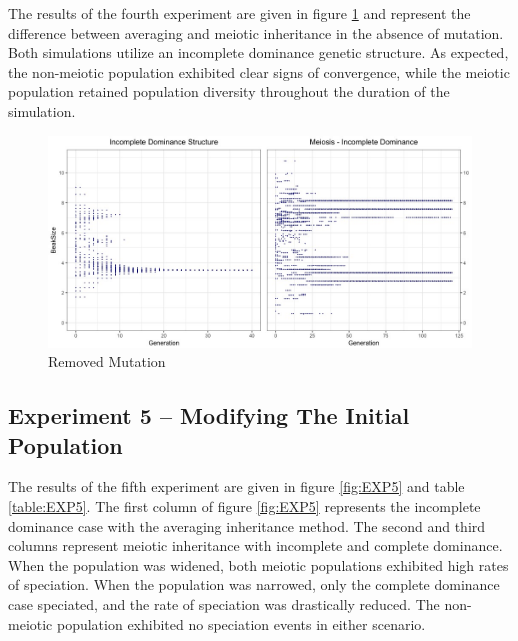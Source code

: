 \documentclass{article}
\begin{document}
The results of the fourth experiment are given in figure \ref{fig:EXP4} and represent the difference between averaging and meiotic inheritance in the absence of mutation. Both simulations utilize an incomplete dominance genetic structure. As expected, the non-meiotic population exhibited clear signs of convergence, while the meiotic population retained population diversity throughout the duration of the simulation. 

\begin{figure} [ht!]
    \centering
    \includegraphics[width=\linewidth]{Data/EXP4}
    \caption{Removed Mutation}
    \label{fig:EXP4}
\end{figure}



\subsection{Experiment 5 -- Modifying The Initial Population} 

The results of the fifth experiment are given in figure \ref{fig:EXP5} and table \ref{table:EXP5}. The first column of figure \ref{fig:EXP5} represents the incomplete dominance case with the averaging inheritance method. The second and third columns represent meiotic inheritance with incomplete and complete dominance. When the population was widened, both meiotic populations exhibited high rates of speciation. When the population was narrowed, only the complete dominance case speciated, and the rate of speciation was drastically reduced. The non-meiotic population exhibited no speciation events in either scenario. 
\end{document}

